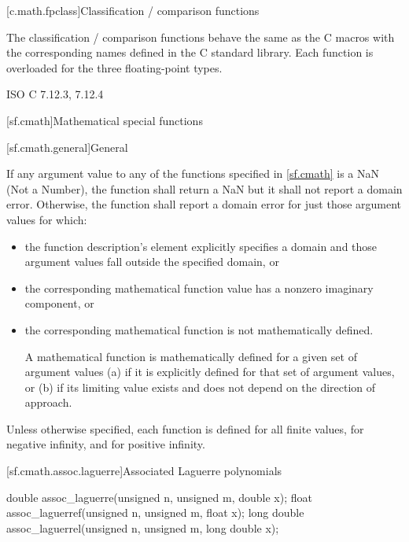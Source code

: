 [c.math.fpclass]{Classification / comparison functions}

\pnum
The classification / comparison functions behave the same as the C macros with the
corresponding names defined in the C standard library.
Each function is overloaded for the three floating-point types.

\xref
ISO C 7.12.3, 7.12.4

[sf.cmath]{Mathematical special functions}%

[sf.cmath.general]{General}%
%

\pnum
{}%
If any argument value
to any of the functions specified in \ref{sf.cmath}
is a NaN (Not a Number),
the function shall return a NaN
but it shall not report a domain error.
Otherwise,
the function shall report a domain error
for just those argument values
for which:
\begin{itemize}
  \item
  the function description's \returns element
  explicitly specifies a domain
  and those argument values fall
  outside the specified domain,
  or

  \item
  the corresponding mathematical function value
  has a nonzero imaginary component,
  or

  \item
  the corresponding mathematical function
  is not mathematically defined.
\begin{footnote}
    A mathematical function
    is mathematically defined
    for a given set of argument values
    (a)
      if it is explicitly defined
      for that set of argument values,
      or
    (b)
      if its limiting value exists
      and does not depend
      on the direction of approach.
\end{footnote}
\end{itemize}

\pnum
Unless otherwise specified,
each function is defined
for all finite values,
for negative infinity,
and for positive infinity.

[sf.cmath.assoc.laguerre]{Associated Laguerre polynomials}%
%
%
%
%
%
\begin{itemdecl}
double       assoc_laguerre(unsigned n, unsigned m, double x);
float        assoc_laguerref(unsigned n, unsigned m, float x);
long double  assoc_laguerrel(unsigned n, unsigned m, long double x);
\end{itemdecl}

